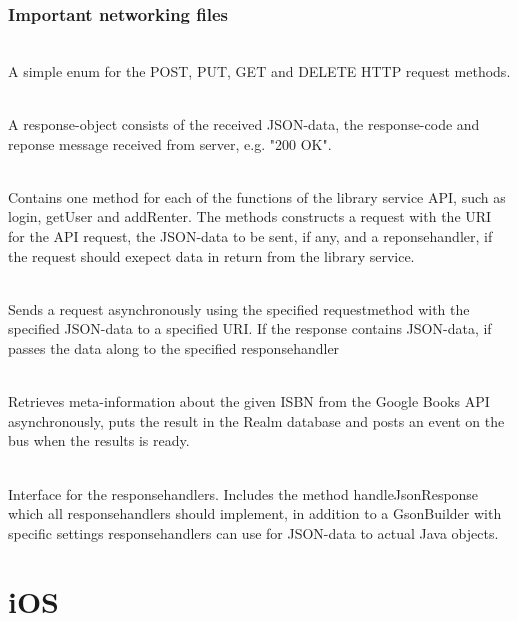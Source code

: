 \subsubsection{Important networking files}
    \begin{description}
        \item{} \\
            A simple enum for the POST, PUT, GET and DELETE HTTP request methods.
        \item{} \\
            A response-object consists of the received JSON-data, the response-code and reponse message received from server, e.g. "200 OK".
        \item{} \\
            Contains one method for each of the functions of the library service API, such as login, getUser and addRenter. The methods constructs a request with the URI for the \gls{API} request, the JSON-data to be sent, if any, and a reponsehandler, if the request should exepect data in return from the library service.   
        \item{} \\
            Sends a request asynchronously using the specified requestmethod with the specified JSON-data to a specified URI. If the response contains JSON-data, if passes the data along to the specified responsehandler 
        \item{} \\
            Retrieves meta-information about the given ISBN from the Google Books \gls{API} asynchronously, puts the result in the Realm database and posts an event on the bus when the results is ready. 
        \item{} \\
            Interface for the responsehandlers. Includes the method handleJsonResponse which all responsehandlers should implement, in addition to a GsonBuilder \cite{gson} with specific settings responsehandlers can use for JSON-data to actual Java objects.
    \end{description}

\section{iOS}
\label{architecture-ios}

